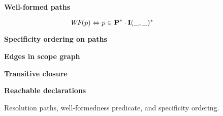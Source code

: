 \begin{figure}[p]
\begin{minipage}[t]{.49\hsize}
\begin{boxedminipage}[t]{\hsize}
\textbf{Well-formed paths}

\vspace*{-0.5\baselineskip}

\[
	   \mbox{\it{WF}}(p) \Leftrightarrow p \in \mbox{\rm\bf{P}}^* \cdot \mbox{\rm\bf{I}}(\_,\_)^* 
\]
	
\textbf{Specificity ordering on paths}



\medskip


\medskip


\medskip



\medskip


\smallskip

\end{boxedminipage}
\caption{Resolution paths, well-formedness predicate, and specificity
ordering.}
\end{minipage}

\bigskip

\begin{boxedminipage}{\hsize}
\textbf{Edges in scope graph}
\smallskip


\medskip


\medskip
\textbf{Transitive closure}

       

\medskip


\smallskip

\textbf{Reachable declarations}
\medskip


\end{boxedminipage}
\end{figure}
